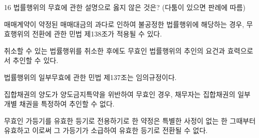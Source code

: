\begin{question}{16}
법률행위의 무효에 관한 설명으로 옳지 않은 것은? (다툼이 있으면 판례에 따름)
\begin{choices}
  \item 매매계약이 약정된 매매대금의 과다로 인하여 불공정한 법률행위에 해당하는 경우, 무효행위의 전환에 관한 민법 제138조가 적용될 수 있다.
  \item 취소할 수 있는 법률행위를 취소한 후에도 무효인 법률행위의 추인의 요건과 효력으로서 추인할 수 있다.
  \item 법률행위의 일부무효에 관한 민법 제137조는 임의규정이다.
  \item 집합채권의 양도가 양도금지특약을 위반하여 무효인 경우, 채무자는 집합채권의 일부 개별 채권을 특정하여 추인할 수 없다.
  \item 무효인 가등기를 유효한 등기로 전용하기로 한 약정은 특별한 사정이 없는 한 그때부터 유효하고 이로써 그 가등기가 소급하여 유효한 등기로 전환될 수 없다.
\end{choices}
\end{question}
